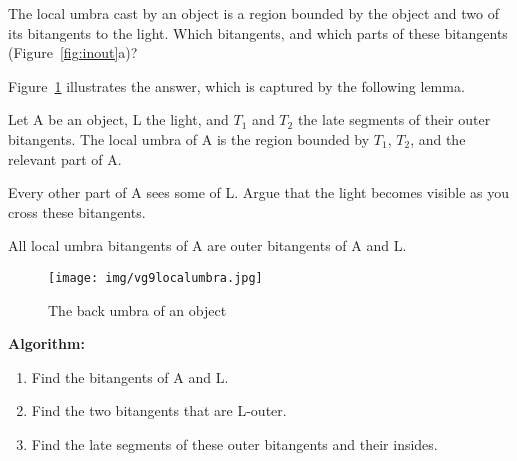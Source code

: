 \documentclass[9pt,twocolumn]{article}
\newif\ifTalk
\begin{document}
The local umbra cast by an object is a region bounded by the object
and two of its bitangents to the light.
Which bitangents, and which parts of these bitangents (Figure~\ref{fig:inout}a)?
\ifTalk
We are looking for bitangents that do not intersect the object or light.
However, we must relax our constraints when the object surrounds the light.
\fi
Figure~\ref{fig:G2} illustrates the answer, which is captured by the following lemma.



\begin{theorem}
\label{thm:localumbra}
Let A be an object, L the light, and
$T_1$ and $T_2$ the late segments of their outer bitangents.
The local umbra of A is the region bounded by $T_1$, $T_2$, 
and the relevant part of A.
\end{theorem}
\prf
Every other part of A sees some of L.
Argue that the light becomes visible as you cross these bitangents.
\QED

\begin{corollary}
All local umbra bitangents of A are outer bitangents of A and L.
\end{corollary}

\begin{figure}
\begin{center}
\texttt{[image: img/vg9localumbra.jpg]}
\end{center}
\caption{The back umbra of an object}
\label{fig:G2}
\end{figure}


\vspace{.1in}

{\bf Algorithm:}
\begin{enumerate}
\item Find the bitangents of A and L.
\item Find the two bitangents that are L-outer.
\item Find the late segments of these outer bitangents and their insides.
\end{enumerate}
\end{document}

